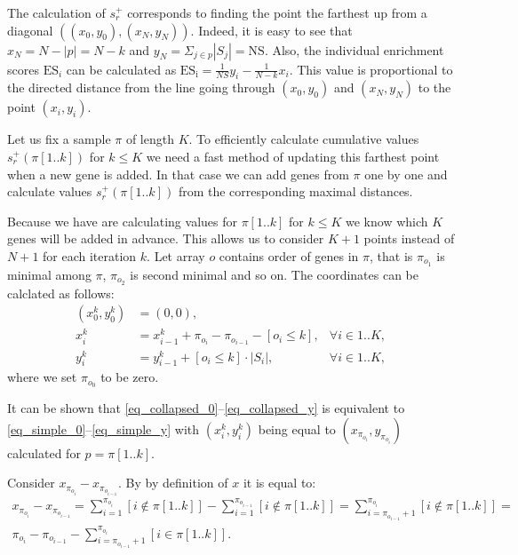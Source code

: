 \documentclass[runningheads,a4paper]{llncs}
\begin{document}
The calculation of $s^+_r$ corresponds to finding the point
the farthest up from a diagonal $\left((x_0, y_0), (x_N, y_N)\right)$. 
Indeed, it is easy to see that $x_N = N - |p| = N - k$ and
$y_N = \Sigma_{j \in p} |S_j| = \mathrm{NS}$.
Also, the individual enrichment scores $\mathrm{ES}_i$ 
can be calculated as 
$\mathrm{ES_i} = \frac{1}{NS} y_i - \frac{1}{N - k} x_i$.
This value is proportional to the directed distance from 
the line going through $(x_0, y_0)$ and $(x_N, y_N)$ 
to the point $(x_i, y_i)$.

Let us fix a sample $\pi$ of length $K$.
To efficiently calculate cumulative values $s^+_r(\pi[1..k])$ for $k \le K$ we
need a fast method of updating this farthest point
when a new gene is added. In that case we can add genes
from $\pi$ one by one and calculate values $s^+_r(\pi[1..k])$ 
from the corresponding maximal distances.

Because we have are calculating values for $\pi[1..k]$ for $k \le K$
we know which $K$ genes will be added in advance.
This allows us to consider $K+1$ points instead of $N+1$ for each iteration 
$k$. Let array $o$ contains order of genes in $\pi$, that is $\pi_{o_1}$
is minimal among $\pi$, $\pi_{o_2}$ is second minimal and so on.
The coordinates can be calclated as follows:
\begin{align}
    \label{eq_collapsed_0}
    (x^k_0, y^k_0) &= (0, 0), & \\ 
    \label{eq_collapsed_x}
    x^k_i &= x^k_{i-1} + \pi_{o_i} - \pi_{o_{i-1}} - \left[o_i \le k\right],       &\forall i \in 1..K, \\
    \label{eq_collapsed_y}
    y^k_i &= y^k_{i-1} + \left[o_i \le k \right] \cdot |S_i|, &\forall i \in 1..K,
\end{align}
where we set $\pi_{o_0}$ to be zero.

It can be shown that \eqref{eq_collapsed_0}--\eqref{eq_collapsed_y} is
equivalent to \eqref{eq_simple_0}--\eqref{eq_simple_y} 
with $(x^k_i, y^k_i)$ being equal to $(x_{\pi_{o_i}}, y_{\pi_{o_i}})$
calculated for $p = \pi[1..k]$.

Consider $x_{\pi_{o_i}} - x_{\pi_{o_{i-1}}}$. By by definition of $x$ 
it is equal to:
\begin{multline*}
    x_{\pi_{o_i}} - x_{\pi_{o_{i-1}}} = 
        \sum_{i=1}^{\pi_{o_i}} [i \not \in \pi [1..k]] - 
        \sum_{i=1}^{\pi_{o_{i-1}}} [i \not \in \pi [1..k]] =  
        \sum_{i=\pi_{o_{i-1}} + 1}^{\pi_{o_i}} [i \not \in \pi [1..k]] = \\
        \pi_{o_i} - \pi_{o_{i-1}} - \sum_{i=\pi_{o_{i-1}} + 1}^{\pi_{o_i}} [i \in \pi [1..k]].
\end{multline*}
\end{document}
